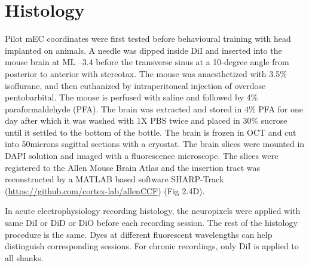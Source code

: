 \section{Histology}
Pilot mEC coordinates were first tested before behavioural training with head implanted on animals. A needle was dipped inside DiI and inserted into the mouse brain at ML –3.4 before the transverse sinus at a 10-degree angle from posterior to anterior with stereotax. The mouse was anaesthetized with 3.5\% isoflurane, and then euthanized by intraperitoneal injection of overdose pentobarbital. The mouse is perfused with saline and followed by 4\% paraformaldehyde (PFA). The brain was extracted and stored in 4\% PFA for one day after which it was washed with 1X PBS twice and placed in 30\% sucrose until it settled to the bottom of the bottle. The brain is frozen in OCT and cut into 50microns sagittal sections with a cryostat. The brain slices were mounted in DAPI solution and imaged with a fluorescence microscope. The slices were registered to the Allen Mouse Brain Atlas and the insertion tract was reconstructed by a MATLAB based software SHARP-Track (\href{https://github.com/cortex-lab/allenCCF}{https://github.com/cortex-lab/allenCCF}) (Fig 2.4D).

In acute electrophysiology recording histology, the neuropixels were applied with same DiI or DiD or DiO before each recording session. The rest of the histology procedure is the same. Dyes at different fluorescent wavelengths can help distinguish corresponding sessions. For chronic recordings, only DiI is applied to all shanks.
